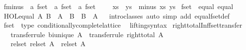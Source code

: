 \begin{isabellebody}
\isamarkupfalse%
\ fminus\ {\isacharcolon}{\isacharcolon}\ {\isachardoublequoteopen}{\isacharprime}a\ fset\ {\isasymRightarrow}\ {\isacharprime}a\ fset\ {\isasymRightarrow}\ {\isacharprime}a\ fset{\isachardoublequoteclose}\ {\isacharparenleft}\ {\isachardoublequoteopen}{\isacharbar}{\isacharminus}{\isacharbar}{\isachardoublequoteclose}\ {}{}{\isacharparenright}\ \ {\isachardoublequoteopen}xs\ {\isacharbar}{\isacharminus}{\isacharbar}\ ys\ {\isasymequiv}\ minus\ xs\ ys{\isachardoublequoteclose}\isanewline
\isanewline
{}\isamarkupfalse%
\ fset\ {\isacharcolon}{\isacharcolon}\ {\isacharparenleft}equal{\isacharparenright}\ equal\isanewline
{}\isanewline
{}\isamarkupfalse%
\ {\isachardoublequoteopen}HOL{\isachardot}equal\ A\ B\ {\isasymlongleftrightarrow}\ A\ {\isacharbar}{\isasymsubseteq}{\isacharbar}\ B\ {\isasymand}\ B\ {\isacharbar}{\isasymsubseteq}{\isacharbar}\ A{\isachardoublequoteclose}\isanewline
{}\isamarkupfalse%
%
\isadelimproof
\ %
\endisadelimproof
%
\isatagproof
{}\isamarkupfalse%
\ intro{\isacharunderscore}classes\ {\isacharparenleft}auto\ simp\ add{\isacharcolon}\ equal{\isacharunderscore}fset{\isacharunderscore}def{\isacharparenright}%
\endisatagproof
{\isafoldproof}%
%
\isadelimproof
%
\endisadelimproof
\isanewline
{}\isamarkupfalse%
\isanewline
\isanewline
{}\isamarkupfalse%
\ fset\ {\isacharcolon}{\isacharcolon}\ {\isacharparenleft}type{\isacharparenright}\ conditionally{\isacharunderscore}complete{\isacharunderscore}lattice\isanewline
{}\isanewline
\isanewline
{}\isamarkupfalse%
\ \ lifting{\isacharunderscore}syntax\isanewline
{}\isanewline
\isanewline
{}\isamarkupfalse%
\ right{\isacharunderscore}total{\isacharunderscore}Inf{\isacharunderscore}fset{\isacharunderscore}transfer{\isacharcolon}\isanewline
\ \ \ {\isacharbrackleft}transfer{\isacharunderscore}rule{\isacharbrackright}{\isacharcolon}\ {\isachardoublequoteopen}bi{\isacharunderscore}unique\ A{\isachardoublequoteclose}\ \ {\isacharbrackleft}transfer{\isacharunderscore}rule{\isacharbrackright}{\isacharcolon}\ {\isachardoublequoteopen}right{\isacharunderscore}total\ A{\isachardoublequoteclose}\isanewline
\ \ \ {\isachardoublequoteopen}{\isacharparenleft}rel{\isacharunderscore}set\ {\isacharparenleft}rel{\isacharunderscore}set\ A{\isacharparenright}\ {\isacharequal}{\isacharequal}{\isacharequal}{\isachargreater}\ rel{\isacharunderscore}set\ A{\isacharparenright}\isanewline

\end{isabellebody}
